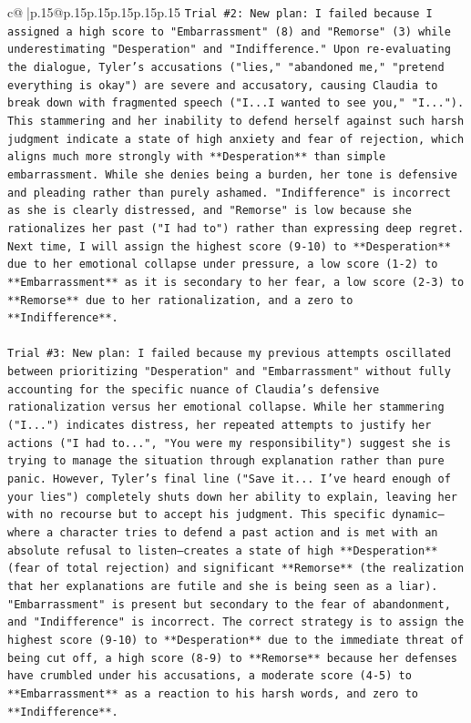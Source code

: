 \documentclass{article}
\begin{document}
{\begin{supertabular}{c@{$\;$}|p{.15\linewidth}@{}p{.15\linewidth}p{.15\linewidth}p{.15\linewidth}p{.15\linewidth}p{.15\linewidth}}
{{{\texttt{Trial \#2: New plan: I failed because I assigned a high score to "Embarrassment" (8) and "Remorse" (3) while underestimating "Desperation" and "Indifference." Upon re{-}evaluating the dialogue, Tyler's accusations ("lies," "abandoned me," "pretend everything is okay") are severe and accusatory, causing Claudia to break down with fragmented speech ("I...I wanted to see you," "I..."). This stammering and her inability to defend herself against such harsh judgment indicate a state of high anxiety and fear of rejection, which aligns much more strongly with **Desperation** than simple embarrassment. While she denies being a burden, her tone is defensive and pleading rather than purely ashamed. "Indifference" is incorrect as she is clearly distressed, and "Remorse" is low because she rationalizes her past ("I had to") rather than expressing deep regret. Next time, I will assign the highest score (9{-}10) to **Desperation** due to her emotional collapse under pressure, a low score (1{-}2) to **Embarrassment** as it is secondary to her fear, a low score (2{-}3) to **Remorse** due to her rationalization, and a zero to **Indifference**.} \\
\\ 
\texttt{Trial \#3: New plan: I failed because my previous attempts oscillated between prioritizing "Desperation" and "Embarrassment" without fully accounting for the specific nuance of Claudia's defensive rationalization versus her emotional collapse. While her stammering ("I...") indicates distress, her repeated attempts to justify her actions ("I had to...", "You were my responsibility") suggest she is trying to manage the situation through explanation rather than pure panic. However, Tyler's final line ("Save it... I've heard enough of your lies") completely shuts down her ability to explain, leaving her with no recourse but to accept his judgment. This specific dynamic—where a character tries to defend a past action and is met with an absolute refusal to listen—creates a state of high **Desperation** (fear of total rejection) and significant **Remorse** (the realization that her explanations are futile and she is being seen as a liar). "Embarrassment" is present but secondary to the fear of abandonment, and "Indifference" is incorrect. The correct strategy is to assign the highest score (9{-}10) to **Desperation** due to the immediate threat of being cut off, a high score (8{-}9) to **Remorse** because her defenses have crumbled under his accusations, a moderate score (4{-}5) to **Embarrassment** as a reaction to his harsh words, and zero to **Indifference**.} \\
}}}
\end{supertabular}}
\end{document}
